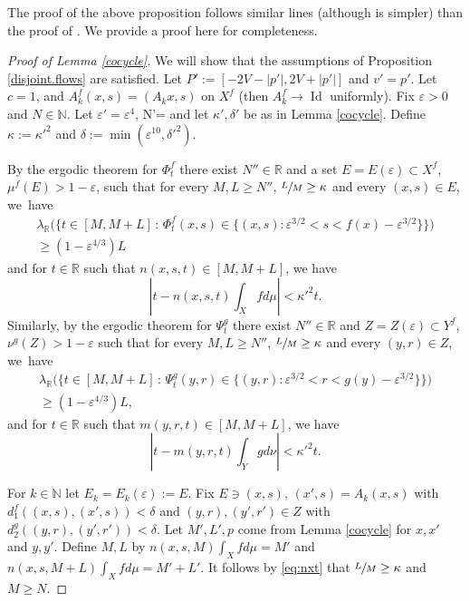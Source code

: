 \documentclass[JEP,XML,SOM,Unicode,NoEqCountersInSection]{cedram}
\let\epsilon\varepsilon
\newcommand{\sep}{\,:\,}
\DeclareMathOperator{\Id}{Id}
\theoremstyle{definition}
\theoremstyle{plain}
\newcommand\NN{\mathbb{N}}
\newcommand\RR{\mathbb{R}}
\begin{document}
The proof of the above proposition follows similar lines (although is simpler) than the proof of \cite[Prop.\,4.1]{KLU}. We provide a proof here for completeness.

\begin{proof}[Proof of Lemma \ref{cocycle}]
We will show that the assumptions of Proposition \ref{disjoint.flows} are satisfied. Let $P':=[-2V-|p'|,2V+|p'|]$ and $v'=p'$. Let $c=1$, and $A_k^f(x,s)=(A_kx,s)$ on $X^f$ (then $A_k^f\to \Id$ uniformly).
Fix $\epsilon>0$ and $N\in \NN$. Let $\epsilon'=\epsilon^4$, N'= and let $\kappa', \delta'$ be as in Lemma \ref{cocycle}. Define $\kappa:=\kappa'^2$ and $\delta:= \min(\epsilon^{10},\delta'^2)$.

By the ergodic theorem for $\Phi_t^f$ there exist $N''\in \RR$ and a set $E=E(\epsilon)\subset X^f$,
$\mu^f(E)>1-\epsilon$, such that for every $M,L\geq N''$, $\sfrac{L}{M}\geq \kappa$ and every $(x,s)\in E$, we~have
\begin{multline}\label{eq:bet1}
\lambda_\RR\bigl(\bigl\{t\in [M,M+L]\sep \Phi_t^f(x,s)\in \{(x,s):\epsilon^{3/2}<s<f(x)-\epsilon^{3/2}\}\bigr\}\bigr)\\
\geq (1-\epsilon^{4/3})L
\end{multline}
and for $t\in \RR$ such that $n(x,s,t)\in [M,M+L]$, we have
\begin{equation}\label{eq:nxt}
|t- n(x,s,t)\int_X fd\mu|<\kappa'^2 t.
\end{equation}
Similarly, by the ergodic theorem for $\Psi_t^g$ there exist $N''\in \RR$ and $Z=Z(\epsilon)\subset Y^f$,
$\nu^g(Z)>1-\epsilon$ such that for every $M,L\geq N''$, $\sfrac{L}{M}\geq \kappa$ and every $(y,r)\in Z$, we~have
\begin{multline}\label{eq:bet2}
\lambda_\RR\bigl(\bigl\{t\in [M,M+L]\sep \Psi_t^g(y,r)\in \{(y,r):\epsilon^{3/2}<r<g(y)-\epsilon^{3/2}\}\bigr\}\bigr)\\
\geq (1-\epsilon^{4/3})L,
\end{multline}
and for $t\in \RR$ such that $m(y,r,t)\in [M,M+L]$, we have
\begin{equation}\label{eq:nxt2}
|t- m(y,r,t)\int_Y gd\nu|<\kappa'^2 t.
\end{equation}

For $k\in \NN$ let $E_k=E_k(\epsilon):=E$. Fix $E\ni (x,s)$, $(x',s)=A_k(x,s)$ with $d_1^f((x,s),(x',s))<\delta$ and $(y,r), (y',r')\in Z$ with $d_2^g((y,r),(y',r'))<\delta$. Let $M',L',p$ come from Lemma \ref{cocycle} for $x,x'$ and $y,y'$. Define $M, L$ by $n(x,s,M)\int_X fd\mu =M'$ and $n(x,s,M+L)\int_X fd\mu=M'+L'$. It follows by \eqref{eq:nxt} that $\sfrac{L}{M}\geq \kappa$ and $M\geq N$.


\end{proof}
\end{document}
